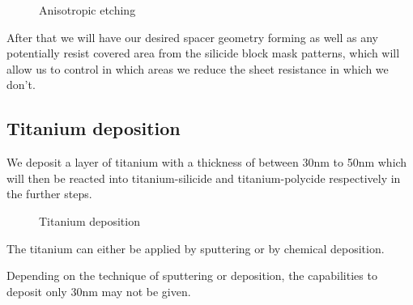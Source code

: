 \begin{figure}[H]
	\centering
	\begin{tikzpicture}[node distance = 3cm, auto, thick,scale=\CrossSectionOnly, every node/.style={transform shape}]
		
	\end{tikzpicture}
	\begin{tikzpicture}[node distance = 3cm, auto, thick,scale=\CrossSectionOnly, every node/.style={transform shape}]
		
	\end{tikzpicture}
	\caption{Anisotropic etching}
\end{figure}

After that we will have our desired spacer geometry forming as well as any potentially resist covered area from the silicide block mask patterns, which will allow us to control in which areas we reduce the sheet resistance in which we don't.

\newpage

\subsection{Titanium deposition}

We deposit a layer of titanium with a thickness of between 30nm to 50nm which will then be reacted into titanium-silicide and titanium-polycide respectively in the further steps.

\begin{figure}[H]
	\centering
	\begin{tikzpicture}[node distance = 3cm, auto, thick,scale=\CrossSectionOnly, every node/.style={transform shape}]
		
	\end{tikzpicture}
	\begin{tikzpicture}[node distance = 3cm, auto, thick,scale=\CrossSectionOnly, every node/.style={transform shape}]
		
	\end{tikzpicture}
	\caption{Titanium deposition}
\end{figure}

The titanium can either be applied by sputtering or by chemical deposition.

Depending on the technique of sputtering or deposition, the capabilities to deposit only 30nm may not be given.

